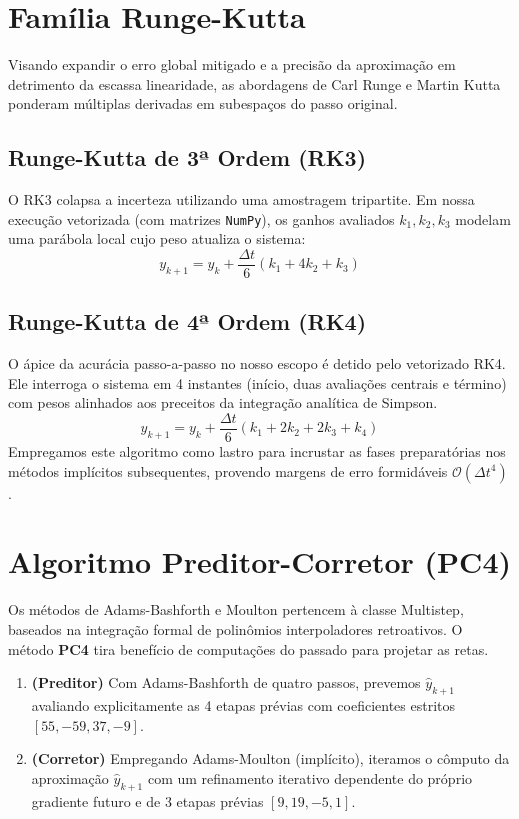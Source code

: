 \documentclass[12pt,a4paper]{article}
\begin{document}
\section{Família Runge-Kutta}
Visando expandir o erro global mitigado e a precisão da aproximação em detrimento da escassa linearidade, as abordagens de Carl Runge e Martin Kutta ponderam múltiplas derivadas em subespaços do passo original.

\subsection{Runge-Kutta de 3ª Ordem (RK3)}
O RK3 colapsa a incerteza utilizando uma amostragem tripartite. Em nossa execução vetorizada (com matrizes \texttt{NumPy}), os ganhos avaliados $k_1, k_2, k_3$ modelam uma parábola local cujo peso atualiza o sistema:
\begin{equation}
y_{k+1}=y_k+\frac{\Delta t}{6}(k_1+4k_2+k_3)
\end{equation}

\subsection{Runge-Kutta de 4ª Ordem (RK4)}
O ápice da acurácia passo-a-passo no nosso escopo é detido pelo vetorizado RK4. Ele interroga o sistema em 4 instantes (início, duas avaliações centrais e término) com pesos alinhados aos preceitos da integração analítica de Simpson. 
\begin{equation}
y_{k+1}=y_k+\frac{\Delta t}{6}(k_1+2k_2+2k_3+k_4)
\end{equation}
Empregamos este algoritmo como lastro para incrustar as fases preparatórias nos métodos implícitos subsequentes, provendo margens de erro formidáveis $\mathcal{O}(\Delta t^4)$.

\section{Algoritmo Preditor-Corretor (PC4)}
Os métodos de Adams-Bashforth e Moulton pertencem à classe Multistep, baseados na integração formal de polinômios interpoladores retroativos. O método \textbf{PC4} tira benefício de computações do passado para projetar as retas.

\begin{enumerate}
    \item \textbf{(Preditor)} Com Adams-Bashforth de quatro passos, prevemos $\hat{y}_{k+1}$ avaliando explicitamente as 4 etapas prévias com coeficientes estritos $[55, -59, 37, -9]$.
    \item \textbf{(Corretor)} Empregando Adams-Moulton (implícito), iteramos o cômputo da aproximação $\hat{y}_{k+1}$ com um refinamento iterativo dependente do próprio gradiente futuro e de 3 etapas prévias $[9, 19, -5, 1]$.
\end{enumerate}
\end{document}
